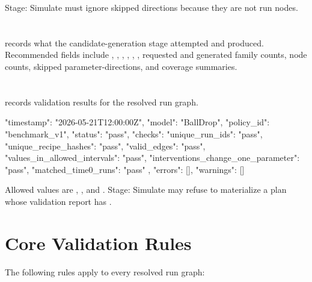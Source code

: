 \documentclass[11pt]{article}
\begin{document}
Stage: Simulate must ignore skipped directions because they are not run nodes.

\section*{\texorpdfstring{}{generation\_report.json}}

 records what the candidate-generation stage attempted and produced.
Recommended fields include , , , , , , requested and generated family counts, node counts, skipped parameter-directions, and coverage summaries.

\section*{\texorpdfstring{}{validation\_report.json}}

 records validation results for the resolved run graph.

\begin{DocCode}
{
  "timestamp": "2026-05-21T12:00:00Z",
  "model": "BallDrop",
  "policy_id": "benchmark_v1",
  "status": "pass",
  "checks": {
    "unique_run_ids": "pass",
    "unique_recipe_hashes": "pass",
    "valid_edges": "pass",
    "values_in_allowed_intervals": "pass",
    "interventions_change_one_parameter": "pass",
    "matched_time0_runs": "pass"
  },
  "errors": [],
  "warnings": []
}
\end{DocCode}

Allowed  values are , , and .
Stage: Simulate may refuse to materialize a plan whose validation report has .

\section*{Core Validation Rules}

The following rules apply to every resolved run graph:
\end{document}
